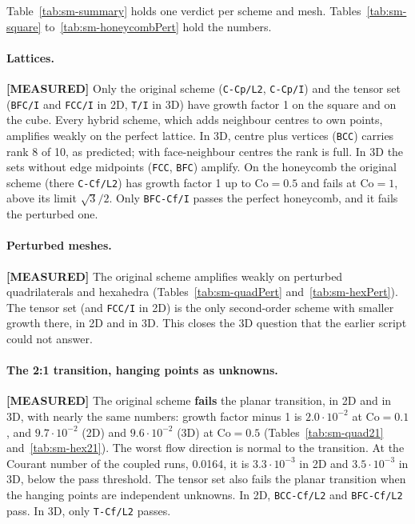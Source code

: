 \documentclass[11pt,a4paper]{article}
\newcommand{\tables}{data/tables}
\newcommand{\measured}{\textcolor{green!35!black}{\textbf{[MEASURED]}}}
\begin{document}
\begin{table}[t]
\centering\footnotesize\setlength{\tabcolsep}{4pt}

\caption{Scheme against mesh. sq: square, cube: cube, hc: honeycomb; -p: perturbed;
-2:1: planar transition; -patch: refined patch. P: pass, F: fail, ?: not decided,
r: no complete quadratic, --: not run.}
\label{tab:sm-summary}
\end{table}

Table~\ref{tab:sm-summary} holds one verdict per scheme and mesh.
Tables~\ref{tab:sm-square} to~\ref{tab:sm-honeycombPert} hold the numbers.

\paragraph{Lattices.} \measured{} Only the original scheme (\texttt{C-Cp/L2},
\texttt{C-Cp/I}) and the tensor set (\texttt{BFC/I} and \texttt{FCC/I} in 2D,
\texttt{T/I} in 3D) have growth factor 1 on the square and on the cube. Every hybrid
scheme, which adds neighbour centres to own points, amplifies weakly on the perfect
lattice. In 3D, centre plus vertices (\texttt{BCC}) carries rank 8 of 10, as predicted;
with face-neighbour centres the rank is full. In 3D the sets without edge midpoints
(\texttt{FCC}, \texttt{BFC}) amplify. On the honeycomb the original scheme (there \texttt{C-Cf/L2}) has growth factor 1 up to
$\mathrm{Co} = 0.5$ and fails at $\mathrm{Co} = 1$, above its limit $\sqrt{3}/2$. Only
\texttt{BFC-Cf/I} passes the perfect honeycomb, and it fails the perturbed one.

\paragraph{Perturbed meshes.} \measured{} The original scheme amplifies weakly on
perturbed quadrilaterals and hexahedra (Tables~\ref{tab:sm-quadPert}
and~\ref{tab:sm-hexPert}). The tensor set (and \texttt{FCC/I} in 2D) is the only second-order scheme with smaller
growth there, in 2D and in 3D. This closes the 3D question that the earlier script could
not answer.

\paragraph{The 2:1 transition, hanging points as unknowns.} \measured{} The original
scheme \textbf{fails} the planar transition, in 2D and in 3D, with nearly the same
numbers: growth factor minus 1 is $2.0\cdot10^{-2}$ at $\mathrm{Co} = 0.1$, and
$9.7\cdot10^{-2}$ (2D) and $9.6\cdot10^{-2}$ (3D) at $\mathrm{Co} = 0.5$ (Tables~\ref{tab:sm-quad21}
and~\ref{tab:sm-hex21}). The worst flow direction is normal to the transition. At the
Courant number of the coupled runs, 0.0164, it is $3.3\cdot10^{-3}$ in 2D and
$3.5\cdot10^{-3}$ in 3D, below the pass threshold. The tensor set also fails the planar
transition when the hanging points are independent unknowns. In 2D, \texttt{BCC-Cf/L2}
and \texttt{BFC-Cf/L2} pass. In 3D, only \texttt{T-Cf/L2} passes.
\end{document}
